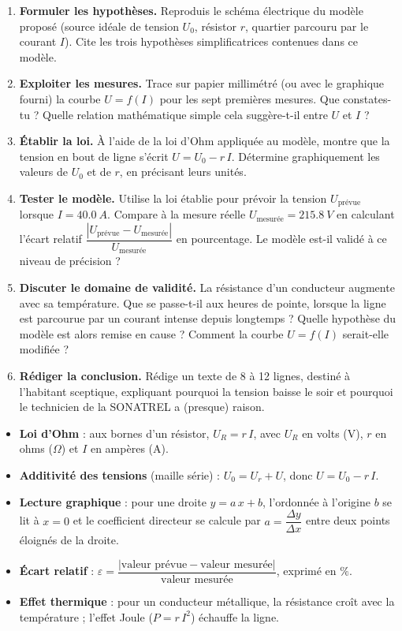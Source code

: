 \documentclass[11pt]{article}
\newcounter{popsec}
\newcounter{popsub}
\newcommand{\courssub}[1]{%
  \stepcounter{popsub}%
  \par\vspace{9pt}\noindent{\popxbold\fontsize{11.5}{13}\selectfont\color{popink}{\color{poporange}\thepopsec.\thepopsub}\hspace{6pt}#1}\par\nopagebreak\vspace{4pt}
}
\begin{document}
\begin{enumerate}
\item \textbf{Formuler les hypothèses.} Reproduis le schéma électrique du modèle proposé (source idéale de tension $U_0$, résistor $r$, quartier parcouru par le courant $I$). Cite les trois hypothèses simplificatrices contenues dans ce modèle.
\item \textbf{Exploiter les mesures.} Trace sur papier millimétré (ou avec le graphique fourni) la courbe $U = f(I)$ pour les sept premières mesures. Que constates-tu ? Quelle relation mathématique simple cela suggère-t-il entre $U$ et $I$ ?
\item \textbf{Établir la loi.} À l'aide de la loi d'Ohm appliquée au modèle, montre que la tension en bout de ligne s'écrit $U = U_0 - r\,I$. Détermine graphiquement les valeurs de $U_0$ et de $r$, en précisant leurs unités.
\item \textbf{Tester le modèle.} Utilise la loi établie pour prévoir la tension $U_{\text{prévue}}$ lorsque $I = \SI{40,0}{A}$. Compare à la mesure réelle $U_{\text{mesurée}} = \SI{215,8}{V}$ en calculant l'écart relatif $\dfrac{|U_{\text{prévue}} - U_{\text{mesurée}}|}{U_{\text{mesurée}}}$ en pourcentage. Le modèle est-il validé à ce niveau de précision ?
\item \textbf{Discuter le domaine de validité.} La résistance d'un conducteur augmente avec sa température. Que se passe-t-il aux heures de pointe, lorsque la ligne est parcourue par un courant intense depuis longtemps ? Quelle hypothèse du modèle est alors remise en cause ? Comment la courbe $U = f(I)$ serait-elle modifiée ?
\item \textbf{Rédiger la conclusion.} Rédige un texte de 8 à 12 lignes, destiné à l'habitant sceptique, expliquant pourquoi la tension \og baisse \fg{} le soir et pourquoi le technicien de la SONATREL a (presque) raison.
\end{enumerate}

\courssub{Ressources à mobiliser}

\begin{aretenir}
\begin{itemize}
\item \textbf{Loi d'Ohm} : aux bornes d'un résistor, $U_R = r\,I$, avec $U_R$ en volts (V), $r$ en ohms ($\Omega$) et $I$ en ampères (A).
\item \textbf{Additivité des tensions} (maille série) : $U_0 = U_r + U$, donc $U = U_0 - r\,I$.
\item \textbf{Lecture graphique} : pour une droite $y = a\,x + b$, l'ordonnée à l'origine $b$ se lit à $x = 0$ et le coefficient directeur se calcule par $a = \dfrac{\Delta y}{\Delta x}$ entre deux points éloignés de la droite.
\item \textbf{Écart relatif} : $\varepsilon = \dfrac{|\text{valeur prévue} - \text{valeur mesurée}|}{\text{valeur mesurée}}$, exprimé en $\%$.
\item \textbf{Effet thermique} : pour un conducteur métallique, la résistance croît avec la température ; l'effet Joule ($P = r\,I^2$) échauffe la ligne.
\end{itemize}
\end{aretenir}
\end{document}
